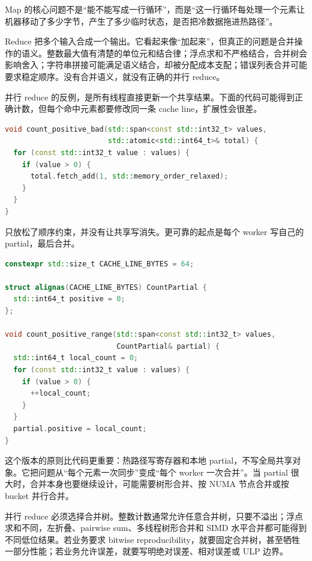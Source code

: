 \begin{mentalmodel}
Map 的核心问题不是“能不能写成一行循环”，而是“这一行循环每处理一个元素让机器移动了多少字节，产生了多少临时状态，是否把冷数据拖进热路径”。
\end{mentalmodel}

Reduce 把多个输入合成一个输出。它看起来像“加起来”，但真正的问题是合并操作的语义。整数最大值有清楚的单位元和结合律；浮点求和不严格结合，合并树会影响舍入；字符串拼接可能满足语义结合，却被分配成本支配；错误列表合并可能要求稳定顺序。没有合并语义，就没有正确的并行 reduce。

并行 reduce 的反例，是所有线程直接更新一个共享结果。下面的代码可能得到正确计数，但每个命中元素都要修改同一条 cache line，扩展性会很差。

\begin{lstlisting}[language=C++,caption={反例：高频共享写的 reduce}]
void count_positive_bad(std::span<const std::int32_t> values,
                        std::atomic<std::int64_t>& total) {
  for (const std::int32_t value : values) {
    if (value > 0) {
      total.fetch_add(1, std::memory_order_relaxed);
    }
  }
}
\end{lstlisting}

 只放松了顺序约束，并没有让共享写消失。更可靠的起点是每个 worker 写自己的 partial，最后合并。

\begin{lstlisting}[language=C++,caption={线程本地 partial，把高频共享写移出热路径}]
constexpr std::size_t CACHE_LINE_BYTES = 64;

struct alignas(CACHE_LINE_BYTES) CountPartial {
  std::int64_t positive = 0;
};

void count_positive_range(std::span<const std::int32_t> values,
                          CountPartial& partial) {
  std::int64_t local_count = 0;
  for (const std::int32_t value : values) {
    if (value > 0) {
      ++local_count;
    }
  }
  partial.positive = local_count;
}
\end{lstlisting}

这个版本的原则比代码更重要：热路径写寄存器和本地 partial，不写全局共享对象。它把问题从“每个元素一次同步”变成“每个 worker 一次合并”。当 partial 很大时，合并本身也要继续设计，可能需要树形合并、按 NUMA 节点合并或按 bucket 并行合并。

并行 reduce 必须选择合并树。整数计数通常允许任意合并树，只要不溢出；浮点求和不同，左折叠、pairwise sum、多线程树形合并和 SIMD 水平合并都可能得到不同低位结果。若业务要求 bitwise reproducibility，就要固定合并树，甚至牺牲一部分性能；若业务允许误差，就要写明绝对误差、相对误差或 ULP 边界。

